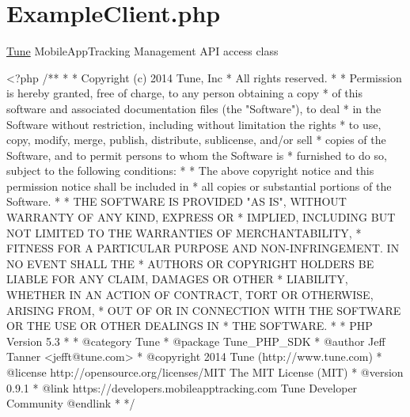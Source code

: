 \hypertarget{ExampleClient_8php-example}{\section{Example\-Client.\-php}
}
\hyperlink{namespaceTune}{Tune} Mobile\-App\-Tracking Management A\-P\-I access class


\begin{DoxyCodeInclude}
<?php\textcolor{comment}{}
\textcolor{comment}{/**}
\textcolor{comment}{ *}
\textcolor{comment}{ * Copyright (c) 2014 Tune, Inc}
\textcolor{comment}{ * All rights reserved.}
\textcolor{comment}{ *}
\textcolor{comment}{ * Permission is hereby granted, free of charge, to any person obtaining a copy}
\textcolor{comment}{ * of this software and associated documentation files (the "Software"), to deal}
\textcolor{comment}{ * in the Software without restriction, including without limitation the rights}
\textcolor{comment}{ * to use, copy, modify, merge, publish, distribute, sublicense, and/or sell}
\textcolor{comment}{ * copies of the Software, and to permit persons to whom the Software is}
\textcolor{comment}{ * furnished to do so, subject to the following conditions:}
\textcolor{comment}{ *}
\textcolor{comment}{ * The above copyright notice and this permission notice shall be included in}
\textcolor{comment}{ * all copies or substantial portions of the Software.}
\textcolor{comment}{ *}
\textcolor{comment}{ * THE SOFTWARE IS PROVIDED "AS IS", WITHOUT WARRANTY OF ANY KIND, EXPRESS OR}
\textcolor{comment}{ * IMPLIED, INCLUDING BUT NOT LIMITED TO THE WARRANTIES OF MERCHANTABILITY,}
\textcolor{comment}{ * FITNESS FOR A PARTICULAR PURPOSE AND NON-INFRINGEMENT. IN NO EVENT SHALL THE}
\textcolor{comment}{ * AUTHORS OR COPYRIGHT HOLDERS BE LIABLE FOR ANY CLAIM, DAMAGES OR OTHER}
\textcolor{comment}{ * LIABILITY, WHETHER IN AN ACTION OF CONTRACT, TORT OR OTHERWISE, ARISING FROM,}
\textcolor{comment}{ * OUT OF OR IN CONNECTION WITH THE SOFTWARE OR THE USE OR OTHER DEALINGS IN}
\textcolor{comment}{ * THE SOFTWARE.}
\textcolor{comment}{ *}
\textcolor{comment}{ * PHP Version 5.3}
\textcolor{comment}{ *}
\textcolor{comment}{ * @category  Tune}
\textcolor{comment}{ * @package   Tune\_PHP\_SDK}
\textcolor{comment}{ * @author    Jeff Tanner <jefft@tune.com>}
\textcolor{comment}{ * @copyright 2014 Tune (http://www.tune.com)}
\textcolor{comment}{ * @license   http://opensource.org/licenses/MIT The MIT License (MIT)}
\textcolor{comment}{ * @version   0.9.1}
\textcolor{comment}{ * @link      https://developers.mobileapptracking.com Tune Developer Community @endlink}
\textcolor{comment}{ *}
\textcolor{comment}{ */}


\end{DoxyCodeInclude}
